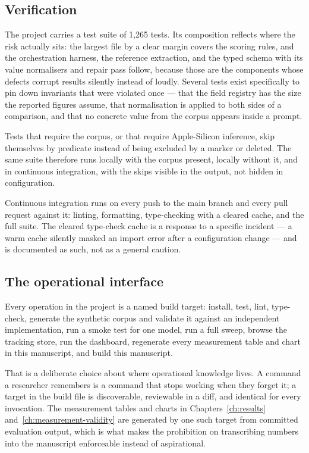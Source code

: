 \subsection{Verification}
\label{sec:impl-verification}

The project carries a test suite of 1{,}265 tests. Its composition reflects where the risk
actually sits: the largest file by a clear margin covers the scoring rules, and the orchestration
harness, the reference extraction, and the typed schema with its value normalisers and repair
pass follow, because those are the components whose defects corrupt results silently instead of
loudly. Several tests exist specifically to pin down invariants that were violated once --- that
the field registry has the size the reported figures assume, that normalisation is applied to both
sides of a comparison, and that no concrete value from the corpus appears inside a prompt.

Tests that require the corpus, or that require Apple-Silicon inference, skip themselves by
predicate instead of being excluded by a marker or deleted. The same suite therefore runs
locally with the corpus present, locally without it, and in continuous integration, with the
skips visible in the output, not hidden in configuration.

Continuous integration runs on every push to the main branch and every pull request against it:
linting, formatting, type-checking with a cleared cache, and the full suite. The cleared
type-check cache is a response to a specific incident --- a warm cache silently masked an import
error after a configuration change --- and is documented as such, not as a general caution.

\subsection{The operational interface}
\label{sec:impl-assets}

Every operation in the project is a named build target: install, test, lint, type-check,
generate the synthetic corpus and validate it against an independent implementation, run a
smoke test for one model, run a full sweep, browse the tracking store, run the dashboard,
regenerate every measurement table and chart in this manuscript, and build this manuscript.

That is a deliberate choice about where operational knowledge lives. A command a researcher
remembers is a command that stops working when they forget it; a target in the build file is
discoverable, reviewable in a diff, and identical for every invocation. The measurement
tables and charts in Chapters~\ref{ch:results} and~\ref{ch:measurement-validity} are
generated by one such target from committed evaluation output, which is what makes the prohibition on transcribing
numbers into the manuscript enforceable instead of aspirational.

